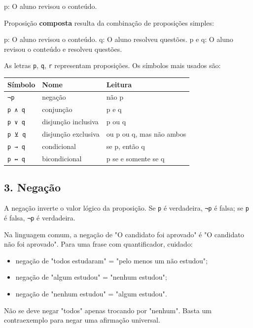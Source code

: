 \documentclass[11pt,a4paper]{article}
\begin{document}
\begin{alerta}
p: O aluno revisou o conteúdo.
\end{alerta}

Proposição \textbf{composta} resulta da combinação de proposições simples:

\begin{alerta}
p: O aluno revisou o conteúdo. q: O aluno resolveu questões. p e q: O aluno revisou o conteúdo e resolveu questões.
\end{alerta}

As letras \texttt{p}, \texttt{q}, \texttt{r} representam proposições. Os símbolos mais usados são:

\begin{tabularx}{\linewidth}{llX}
\toprule
 \textbf{Símbolo} & \textbf{Nome} & \textbf{Leitura} \\
\midrule
 \texttt{¬p} & negação & não p \\
 \texttt{p ∧ q} & conjunção & p e q \\
 \texttt{p ∨ q} & disjunção inclusiva & p ou q \\
 \texttt{p ⊻ q} & disjunção exclusiva & ou p ou q, mas não ambos \\
 \texttt{p → q} & condicional & se p, então q \\
 \texttt{p ↔ q} & bicondicional & p se e somente se q \\
\bottomrule
\end{tabularx}


\subsection*{3. Negação}

A negação inverte o valor lógico da proposição. Se \texttt{p} é verdadeira, \texttt{¬p} é falsa; se \texttt{p} é falsa, \texttt{¬p} é verdadeira.

Na linguagem comum, a negação de "O candidato foi aprovado" é "O candidato não foi aprovado". Para uma frase com quantificador, cuidado:

\begin{itemize}
  \item negação de "todos estudaram" = "pelo menos um não estudou";
  \item negação de "algum estudou" = "nenhum estudou";
  \item negação de "nenhum estudou" = "algum estudou".
\end{itemize}

Não se deve negar "todos" apenas trocando por "nenhum". Basta um contraexemplo para negar uma afirmação universal.
\end{document}
